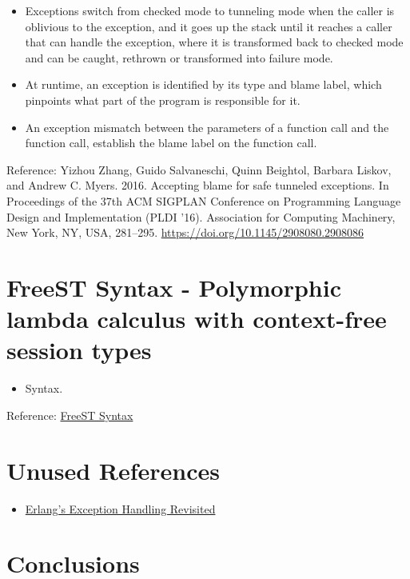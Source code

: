 \documentclass[a4paper,11pt]{article}
\theoremstyle{plain}
\theoremstyle{nonumberplain}
\begin{document}
\begin{itemize}
  \item Exceptions switch from checked mode to tunneling mode when the caller is oblivious to the exception, and it goes up the stack until it reaches a caller that can handle the exception, where it is transformed back to checked mode and can be caught, rethrown or transformed into failure mode.
  \item At runtime, an exception is identified by its type and blame label, which pinpoints what part of the program is responsible for it.
  \item An exception mismatch between the parameters of a function call and the function call, establish the blame label on the function call.
\end{itemize}

Reference: Yizhou Zhang, Guido Salvaneschi, Quinn Beightol, Barbara Liskov, and Andrew C. Myers. 2016. Accepting blame for safe tunneled exceptions. In Proceedings of the 37th ACM SIGPLAN Conference on Programming Language Design and Implementation (PLDI '16). Association for Computing Machinery, New York, NY, USA, 281--295. \href{https://doi.org/10.1145/2908080.2908086}{https://doi.org/10.1145/2908080.2908086}

\section{FreeST Syntax - Polymorphic lambda calculus with context-free session types}

\begin{itemize}
  \item Syntax.
\end{itemize}

Reference: \href{https://www.sciencedirect.com/science/article/pii/S0890540122001031}{FreeST Syntax}

\section{Unused References}

\begin{itemize}
  \item \href{https://erlang.org/workshop/2004/exception.pdf}{Erlang's Exception Handling Revisited}
\end{itemize}

\section{Conclusions}
\end{document}
